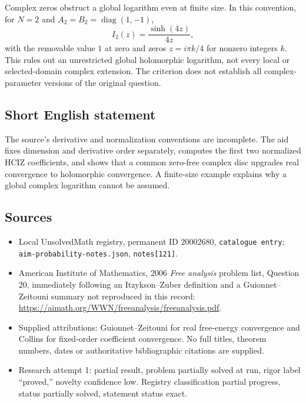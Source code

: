 \documentclass[11pt]{article}
\begin{document}
Complex zeros obstruct a global logarithm even at finite size. In this convention, for $N=2$ and $A_2=B_2=\operatorname{diag}(1,-1)$,
\[
I_2(z)=\frac{\sinh(4z)}{4z},
\]
with the removable value $1$ at zero and zeros $z=i\pi k/4$ for nonzero integers $k$. This rules out an unrestricted global holomorphic logarithm, not every local or selected-domain complex extension. The criterion does not establish all complex-parameter versions of the original question.
\subsection{Short English statement}
The source's derivative and normalization conventions are incomplete. The aid fixes dimension and derivative order separately, computes the first two normalized HCIZ coefficients, and shows that a common zero-free complex disc upgrades real convergence to holomorphic convergence. A finite-size example explains why a global complex logarithm cannot be assumed.
\subsection{Sources}
\begin{itemize}
\item Local UnsolvedMath registry, permanent ID $20002680$, \texttt{catalogue entry}; \texttt{aim-probability-notes.json}, \texttt{notes[121]}.
\item American Institute of Mathematics, 2006 \emph{Free analysis} problem list, Question 20, immediately following an Itzykson--Zuber definition and a Guionnet--Zeitouni summary not reproduced in this record: \url{https://aimath.org/WWN/freeanalysis/freeanalysis.pdf}.
\item Supplied attributions: Guionnet--Zeitouni for real free-energy convergence and Collins for fixed-order coefficient convergence. No full titles, theorem numbers, dates or authoritative bibliographic citations are supplied.
\item Research attempt 1: partial result, problem partially solved at run, rigor label ``proved,'' novelty confidence low. Registry classification partial progress, status partially solved, statement status exact.
\end{itemize}
\end{document}
